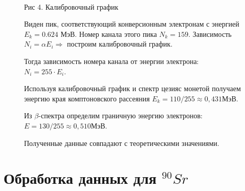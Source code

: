\documentclass[12pt]{article}
\begin{document}
    \begin{figure}[h!]
      \begin{minipage}[h]{0.55\linewidth}
         \\
        Рис 4. Калибровочный график
      \end{minipage}
      \begin{minipage}[h]{0.44\linewidth}
        Виден пик, соответствующий конверсионным электронам с энергией
        $E_k = 0.624$ МэВ. Номер канала этого пика $N_k = 159$.
        Зависимость $N_i = \alpha E_i \Rightarrow$ построим калибровочный
        график.

        Тогда зависимость номера канала от энергии электрона:
        $N_i = 255 \cdot E_i$.

        Используя калибровочный график и спектр цезияс монетой получаем энергию
        края комптоновского рассеяния $E_k = 110/255 \approx 0,431$МэВ.

        Из $\beta$-спектра определим граничную энергию электронов:
        $E = 130/255 \approx 0,510$МэВ.

        Полученные данные совпадают с теоретическими значениями.
      \end{minipage}
      \label{chart:calibr}
    \end{figure}


  \newpage
  \section{Обработка данных для $^{90}Sr$}
\end{document}
